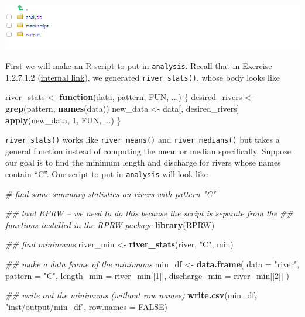 \documentclass[
]{book}
\newenvironment{Shaded}{\begin{snugshade}}{\end{snugshade}}
\newcommand{\CommentTok}[1]{\textcolor[rgb]{0.56,0.35,0.01}{\textit{#1}}}
\newcommand{\ControlFlowTok}[1]{\textcolor[rgb]{0.13,0.29,0.53}{\textbf{#1}}}
\newcommand{\DataTypeTok}[1]{\textcolor[rgb]{0.13,0.29,0.53}{#1}}
\newcommand{\DecValTok}[1]{\textcolor[rgb]{0.00,0.00,0.81}{#1}}
\newcommand{\KeywordTok}[1]{\textcolor[rgb]{0.13,0.29,0.53}{\textbf{#1}}}
\newcommand{\NormalTok}[1]{#1}
\newcommand{\OtherTok}[1]{\textcolor[rgb]{0.56,0.35,0.01}{#1}}
\newcommand{\StringTok}[1]{\textcolor[rgb]{0.31,0.60,0.02}{#1}}
\begin{document}
\includegraphics[width=1\linewidth]{images/newrpack_files10}

First we will make an R script to put in \texttt{analysis}. Recall that in Exercise 1.2.7.1.2 (\protect\hyperlink{ex-set3}{internal link}), we generated \texttt{river\_stats()}, whose body looks like

\begin{Shaded}
\begin{Highlighting}[]
\NormalTok{river_stats <-}\StringTok{ }\ControlFlowTok{function}\NormalTok{(data, pattern, FUN, ...) \{}
\NormalTok{  desired_rivers <-}\StringTok{ }\KeywordTok{grep}\NormalTok{(pattern, }\KeywordTok{names}\NormalTok{(data))}
\NormalTok{  new_data <-}\StringTok{ }\NormalTok{data[, desired_rivers]}
  \KeywordTok{apply}\NormalTok{(new_data, }\DecValTok{1}\NormalTok{, FUN, ...)}
\NormalTok{\}}
\end{Highlighting}
\end{Shaded}

\texttt{river\_stats()} works like \texttt{river\_means()} and \texttt{river\_medians()} but takes a general function instead of computing the mean or median specifically. Suppose our goal is to find the minimum length and discharge for rivers whose names contain ``C''. Our script to put in \texttt{analysis} will look like

\begin{Shaded}
\begin{Highlighting}[]
\CommentTok{# find some summary statistics on rivers with pattern "C"}

\CommentTok{## load RPRW -- we need to do this because the script is separate from the }
  \CommentTok{## functions installed in the RPRW package}
\KeywordTok{library}\NormalTok{(RPRW) }

\CommentTok{## find minimums}
\NormalTok{river_min <-}\StringTok{ }\KeywordTok{river_stats}\NormalTok{(river, }\StringTok{"C"}\NormalTok{, min)}

\CommentTok{## make a data frame of the minimums}
\NormalTok{min_df <-}\StringTok{ }\KeywordTok{data.frame}\NormalTok{(}
  \DataTypeTok{data =} \StringTok{"river"}\NormalTok{,}
  \DataTypeTok{pattern =} \StringTok{"C"}\NormalTok{,}
  \DataTypeTok{length_min =}\NormalTok{ river_min[[}\DecValTok{1}\NormalTok{]],}
  \DataTypeTok{discharge_min =}\NormalTok{ river_min[[}\DecValTok{2}\NormalTok{]]}
\NormalTok{)}

\CommentTok{## write out the minimums (without row names)}
\KeywordTok{write.csv}\NormalTok{(min_df, }\StringTok{"inst/output/min_df"}\NormalTok{, }\DataTypeTok{row.names =} \OtherTok{FALSE}\NormalTok{)}
\end{Highlighting}
\end{Shaded}
\end{document}
